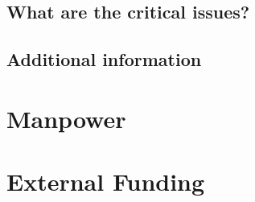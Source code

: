 \documentclass{article}
\begin{document}
\subsection{What are the critical issues?}







%
\subsection{Additional information}








\section{Manpower}








\section{External Funding}








\printbibliography

%

\appendix
\end{document}
